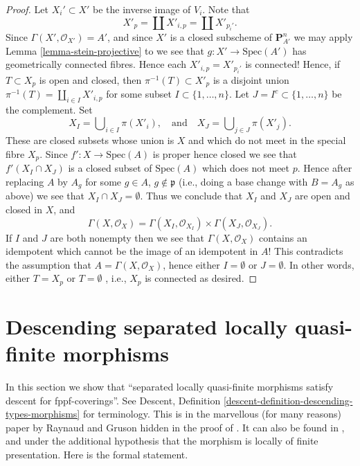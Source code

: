 \begin{proof}
\medskip\noindent
Let $X_i' \subset X'$ be the inverse image of $V_i$.
Note that
$$
X'_p = \coprod X'_{i, p} = \coprod X'_{p_i'}.
$$
Since $\Gamma(X', \mathcal{O}_{X'}) = A'$, and since $X'$
is a closed subscheme of $\mathbf{P}^n_{A'}$ we may apply
Lemma \ref{lemma-stein-projective} to
we see that $g : X' \to \text{Spec}(A')$ has geometrically connected fibres.
Hence each $X'_{i, p} = X'_{p_i'}$ is connected!
Hence, if $T \subset X_p$ is open and closed, then
$\pi^{-1}(T) \subset X'_p$ is a disjoint union
$\pi^{-1}(T) = \coprod_{i \in I} X'_{i, p}$ for some subset
$I \subset \{1, \ldots, n\}$. Let $J = I^c \subset \{1, \ldots, n\}$
be the complement. Set
$$
X_I = \bigcup\nolimits_{i \in I} \pi(X'_i),
\quad\text{and}\quad
X_J = \bigcup\nolimits_{j \in J} \pi(X'_j).
$$
These are closed subsets whose union is $X$ and
which do not meet in the special fibre $X_p$.
Since $f' : X \to \text{Spec}(A)$ is proper hence closed we see that
$f'(X_I \cap X_J)$ is a closed subset of $\text{Spec}(A)$ which
does not meet $p$. Hence after replacing $A$ by $A_g$ for some $g \in A$,
$g \not \in \mathfrak p$ (i.e., doing a base change with $B = A_g$ as
above) we see that $X_I \cap X_J = \emptyset$.
Thus we conclude that $X_I$ and $X_J$ are open and closed in $X$, and
$$
\Gamma(X, \mathcal{O}_X) = 
\Gamma(X_I, \mathcal{O}_{X_I}) \times
\Gamma(X_J, \mathcal{O}_{X_J}).
$$
If $I$ and $J$ are both nonempty then we see that $\Gamma(X, \mathcal{O}_X)$
contains an idempotent which cannot be the image of an idempotent in $A$!
This contradicts the assumption that $A = \Gamma(X, \mathcal{O}_X)$, hence
either $I = \emptyset$ or $J = \emptyset$. In other words, either
$T = X_p$ or $T = \emptyset$ , i.e., $X_p$ is connected as desired.
\end{proof}



















\section{Descending separated locally quasi-finite morphisms}
\label{section-separated-locally-quasi-finite}

\noindent
In this section we show that ``separated locally quasi-finite morphisms
satisfy descent for fppf-coverings''. See Descent, Definition
\ref{descent-definition-descending-types-morphisms} for terminology.
This is in the marvellous
(for many reasons) paper by Raynaud and Gruson hidden in the proof
of \cite[Lemma 5.7.1]{GruRay}.
It can also be found in \cite{Murre-representation}, and
\cite[Expos\'e X, Lemma 5.4]{SGA3}
under the additional
hypothesis that the morphism is locally of finite presentation.
Here is the formal statement.

